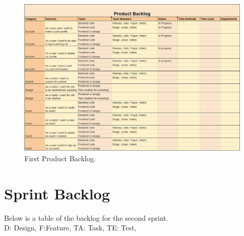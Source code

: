 \begin{figure}[ht!]
\centering
\includegraphics[width={\linewidth}]{Sprint2/img/Sprint2-FirstProductBacklog.png}
\caption{First Product Backlog. \label{overflow}}
\end{figure}

\section{Sprint Backlog}

Below is a table of the backlog for the second sprint. \\ D: Design, F:Feature, TA: Task, TE: Test, 

